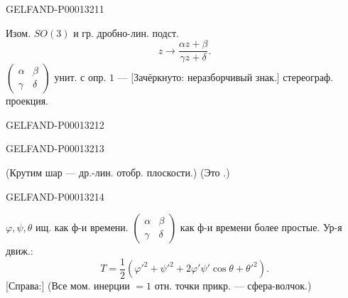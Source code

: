 \begin{GelfandAdjacentEvidence}{GELFAND-P000132}{11}

Изом. $SO(3)$ и гр. дробно-лин. подст.
\begin{equation*}z\longrightarrow\frac{\alpha z+\beta}{\gamma z+\delta}.\end{equation*}
$\begin{pmatrix}\alpha&\beta\\\gamma&\delta\end{pmatrix}$ унит. с опр. $1$ — [Зачёркнуто: неразборчивый знак.] стереограф. проекция.
\end{GelfandAdjacentEvidence}
\begin{GelfandAdjacentEvidence}{GELFAND-P000132}{12}

\end{GelfandAdjacentEvidence}
\begin{GelfandAdjacentEvidence}{GELFAND-P000132}{13}

(Крутим шар — др.-лин. отобр. плоскости.) (Это .)

\end{GelfandAdjacentEvidence}
\begin{GelfandAdjacentEvidence}{GELFAND-P000132}{14}

$\varphi,\psi,\theta$ ищ. как ф-и времени. $\begin{pmatrix}\alpha&\beta\\\gamma&\delta\end{pmatrix}$ как ф-и времени более простые.
Ур-я движ.:
\begin{equation*}T=\frac12(\varphi'^2+\psi'^2+2\varphi'\psi'\cos\theta+\theta'^2).\end{equation*}
[Справа:] (Все мом. инерции $=1$ отн. точки прикр. — сфера-волчок.)
\end{GelfandAdjacentEvidence}
